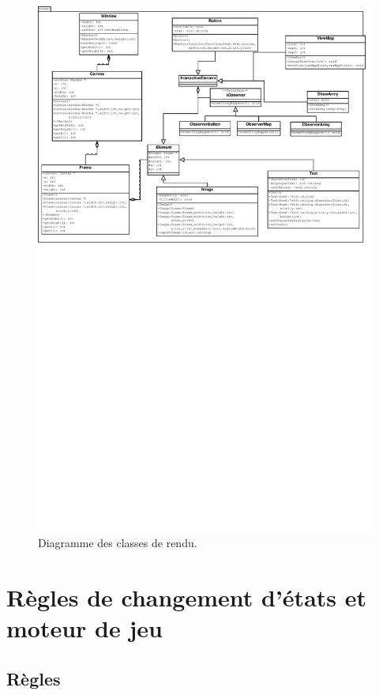 \documentclass[a4paper,12pt]{article}
\begin{document}
\begin{landscape}
\begin{figure}[p]
\includegraphics[width=0.9\paperheight]{render.pdf}
\caption{\label{uml:render}Diagramme des classes de rendu.} 
\end{figure}
\end{landscape}

\clearpage
\section{Règles de changement d'états et moteur de jeu}

\subsection{Règles}
\end{document}
